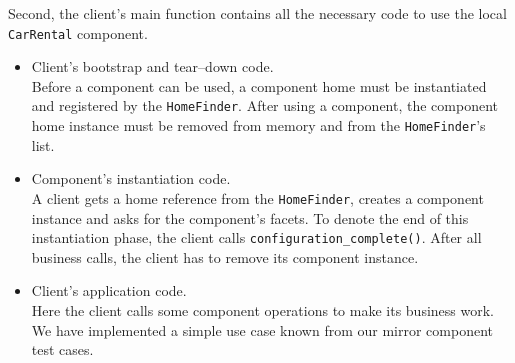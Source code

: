 Second, the client's main function contains all the necessary code to use
the local {\tt CarRental} component. 
\begin{itemize}
\item Client's bootstrap and tear--down code.\\
Before a component can be used, a component home must be instantiated and 
registered by the {\tt HomeFinder}.
After using a component, the component home instance must be removed from 
memory and from the {\tt HomeFinder}'s list.
\item Component's instantiation code. \\
A client gets a home reference from the {\tt HomeFinder}, creates a component 
instance and asks for the component's facets.
To denote the end of this instantiation phase, the client calls 
{\tt configuration\_complete()}.
After all business calls, the client has to remove its component instance.

\item Client's application code. \\
Here the client calls some component operations to make its business work.
We have implemented a simple use case known from our mirror component test 
cases.
\end{itemize}


